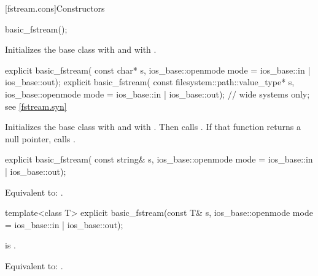 [fstream.cons]{Constructors}

%
\begin{itemdecl}
basic_fstream();
\end{itemdecl}

\begin{itemdescr}
\pnum
\effects
Initializes the base class with
and
 with .
\end{itemdescr}

%
\begin{itemdecl}
explicit basic_fstream(
  const char* s,
  ios_base::openmode mode = ios_base::in | ios_base::out);
explicit basic_fstream(
  const filesystem::path::value_type* s,
  ios_base::openmode mode = ios_base::in | ios_base::out);  // wide systems only; see \ref{fstream.syn}
\end{itemdecl}

\begin{itemdescr}
\pnum
\effects
Initializes the base class with
and
 with .
Then calls
.
If that function returns a null pointer, calls
.
\end{itemdescr}

%
\begin{itemdecl}
explicit basic_fstream(
  const string& s,
  ios_base::openmode mode = ios_base::in | ios_base::out);
\end{itemdecl}

\begin{itemdescr}
\pnum
\effects
Equivalent to: .
\end{itemdescr}

%
\begin{itemdecl}
template<class T>
  explicit basic_fstream(const T& s, ios_base::openmode mode = ios_base::in | ios_base::out);
\end{itemdecl}

\begin{itemdescr}
\pnum
\constraints
{} is .

\pnum
\effects
Equivalent to: .
\end{itemdescr}

